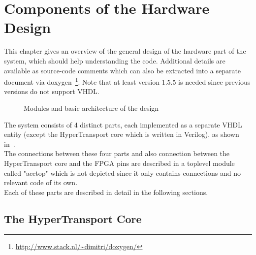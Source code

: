 \chapter{Components of the Hardware Design}

This chapter gives an overview of the general design of the hardware
part of the system, which should help understanding the code.
Additional details are available as source-code comments which
can also be extracted into a separate document via
doxygen~\footnote{\url{http://www.stack.nl/~dimitri/doxygen/}}.
Note that at least version 1.5.5 is needed since previous versions
do not support VHDL.\\

\begin{figure}[ht]
\begin{center}

\end{center}
\caption{Modules and basic architecture of the design}
\label{fig:modules}
\end{figure}

The system consists of 4 distinct parts, each implemented as a
separate VHDL entity (except the HyperTransport core which is written in
Verilog), as shown in~.\\
The connections between these four parts and also connection between the
HyperTransport core and the FPGA pins are described in a toplevel module
called "acctop" which is not depicted since it only contains connections
and no relevant code of its own.\\
Each of these parts are described in detail in the following sections.

\section{The HyperTransport Core}

